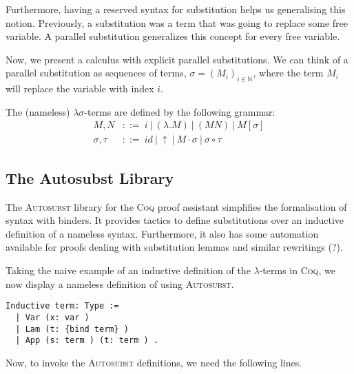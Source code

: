 Furthermore, having a reserved syntax for substitution helps us generalising this notion.
Previously, a substitution  was a term that was going to replace some free variable.
A parallel substitution generalizes this concept for every free variable. 

Now, we present a calculus with explicit parallel substitutions.
We can think of a parallel substitution as sequences of terms, $\sigma = (M_i)_{i \in \mathbb{N}}$, where the term $M_i$ will replace the variable with index $i$.


\begin{definition}
  The (nameless) $\lambda \sigma$-terms are defined by the following grammar:  
  \begin{align*}
    M, N         &::= \ i \ | \ (\lambda . M) \ | \ (M N) \ | \ M[\sigma] \\
    \sigma, \tau &::= \ id \ | \ \uparrow \ | \ M \cdot \sigma \ | \ \sigma \circ \tau
  \end{align*}
\end{definition}

\begin{definition}

\end{definition}

\subsection{The Autosubst Library}
\cite{AutosubstSchafer}

The \textsc{Autosubst} library for the \textsc{Coq} proof assistant simplifies the formalisation of syntax with binders.
It provides tactics to define substitutions over an inductive definition of a nameless syntax.
Furthermore, it also has some automation available for proofs dealing with substitution lemmas and similar rewritings (?).

Taking the naive example of an inductive definition of the $\lambda$-terms in \textsc{Coq}, we now display a nameless definition of using \textsc{Autosubst}.

\begin{lstlisting}[language=Coq]
  Inductive term: Type :=
  | Var (x: var )
  | Lam (t: {bind term} )
  | App (s: term ) (t: term ) .
\end{lstlisting}

Now, to invoke the \textsc{Autosubst} definitions, we need the following lines.


